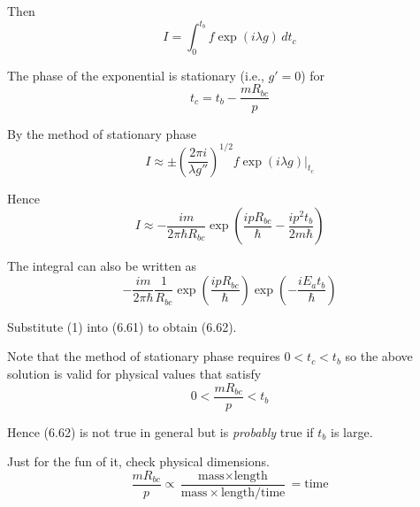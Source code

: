 \documentclass[12pt]{article}
\begin{document}
Then
\begin{equation*}
I=\int_0^{t_b}f\exp(i\lambda g)\,dt_c
\end{equation*}

The phase of the exponential is stationary (i.e., $g'=0$) for
\begin{equation*}
t_c=t_b-\frac{mR_{bc}}{p}
\end{equation*}

By the method of stationary phase
\begin{equation*}
I\approx\pm\left(\frac{2\pi i}{\lambda g''}\right)^{1/2}
f\exp(i\lambda g)\bigg|_{t_c}
\end{equation*}

Hence
\begin{equation*}
I\approx-\frac{im}{2\pi\hbar R_{bc}}
\exp\left(\frac{ipR_{bc}}{\hbar}-\frac{ip^2t_b}{2m\hbar}\right)
\end{equation*}

The integral can also be written as
\begin{equation*}
-\frac{im}{2\pi\hbar}
\frac{1}{R_{bc}}
\exp\left(\frac{ipR_{bc}}{\hbar}\right)
\exp\left(-\frac{iE_at_b}{\hbar}\right)
\tag{1}
\end{equation*}

Substitute (1) into (6.61) to obtain (6.62).

\bigskip
Note that the method of stationary phase requires $0<t_c<t_b$ so the above
solution is valid for physical values that satisfy
\begin{equation*}
0<\frac{mR_{bc}}{p}<t_b
\end{equation*}

Hence (6.62) is not true in general but is {\it probably} true if $t_b$ is large.

\bigskip
Just for the fun of it, check physical dimensions.
\begin{equation*}
\frac{mR_{bc}}{p}\propto
\frac{\text{mass}\times\text{length}}{\text{mass}\times\text{length}/\text{time}}
=\text{time}
\end{equation*}
\end{document}
